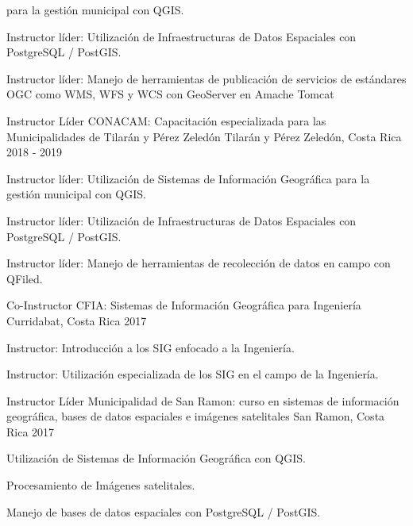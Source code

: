\begin{cventries}
{\begin{cvitems}
      para la gestión municipal con QGIS.
      \item Instructor líder: Utilización de Infraestructuras de Datos Espaciales
      con PostgreSQL / PostGIS.
      \item Instructor líder: Manejo de herramientas de publicación de servicios
      de estándares OGC como WMS, WFS y WCS con GeoServer en Amache Tomcat
    \end{cvitems}
  }
  \cventry
  {Instructor Líder} %
  {CONACAM: Capacitación especializada para las Municipalidades de Tilarán y
    Pérez Zeledón} %
  {Tilarán y Pérez Zeledón, Costa Rica} %
  {2018 - 2019} %
  {
    \begin{cvitems} %
      \item Instructor líder: Utilización de Sistemas de Información Geográfica
      para la gestión municipal con QGIS.
      \item Instructor líder: Utilización de Infraestructuras de Datos Espaciales
      con PostgreSQL / PostGIS.
      \item Instructor líder: Manejo de herramientas de recolección de datos en
      campo con QFiled.
    \end{cvitems}
  }

  \cventry
  {Co-Instructor} %
  {CFIA: Sistemas de Información Geográfica para Ingeniería} %
  {Curridabat, Costa Rica} %
  {2017} %
  {
    \begin{cvitems} %
      \item Instructor: Introducción a los SIG enfocado a la Ingeniería.
      \item Instructor: Utilización especializada de los SIG en el campo de
      la Ingeniería.
    \end{cvitems}
  }

  \cventry
  {Instructor Líder} %
  {Municipalidad de San Ramon: curso en sistemas de
    información geográfica, bases de datos espaciales e imágenes satelitales}
  {San Ramon, Costa Rica} %
  {2017} %
  {
    \begin{cvitems} %
      \item Utilización de Sistemas de Información Geográfica con QGIS.
      \item Procesamiento de Imágenes satelitales.
      \item Manejo de bases de datos espaciales con PostgreSQL / PostGIS.
    \end{cvitems}
  }


\end{cventries}
